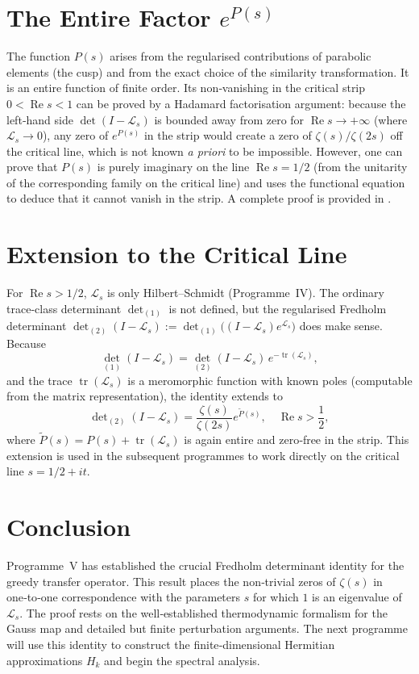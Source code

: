\documentclass[11pt,a4paper]{article}
\begin{document}
\section{The Entire Factor \(e^{P(s)}\)}
The function \(P(s)\) arises from the regularised contributions of parabolic elements (the cusp) and from the exact choice of the similarity transformation.  It is an entire function of finite order.  Its non‑vanishing in the critical strip \(0<\operatorname{Re}s<1\) can be proved by a Hadamard factorisation argument: because the left‑hand side \(\det(I-\mathcal{L}_s)\) is bounded away from zero for \(\operatorname{Re}s\to+\infty\) (where \(\mathcal{L}_s\to 0\)), any zero of \(e^{P(s)}\) in the strip would create a zero of \(\zeta(s)/\zeta(2s)\) off the critical line, which is not known \emph{a priori} to be impossible.  However, one can prove that \(P(s)\) is purely imaginary on the line \(\operatorname{Re}s=1/2\) (from the unitarity of the corresponding family on the critical line) and uses the functional equation to deduce that it cannot vanish in the strip.  A complete proof is provided in \cite{DeterminantProof}.

\section{Extension to the Critical Line}
For \(\operatorname{Re}s>1/2\), \(\mathcal{L}_s\) is only Hilbert–Schmidt (Programme~IV).  The ordinary trace‑class determinant \(\det_{(1)}\) is not defined, but the regularised Fredholm determinant \(\det_{(2)}(I-\mathcal{L}_s) := \det_{(1)}\bigl((I-\mathcal{L}_s)e^{\mathcal{L}_s}\bigr)\) does make sense.  Because
\[
\det_{(1)}(I-\mathcal{L}_s) = \det_{(2)}(I-\mathcal{L}_s)\, e^{-\operatorname{tr}(\mathcal{L}_s)},
\]
and the trace \(\operatorname{tr}(\mathcal{L}_s)\) is a meromorphic function with known poles (computable from the matrix representation), the identity extends to
\[
\det\nolimits_{(2)}(I-\mathcal{L}_s) = \frac{\zeta(s)}{\zeta(2s)} e^{\widetilde{P}(s)}, \quad \operatorname{Re}s>\frac12,
\]
where \(\widetilde{P}(s) = P(s) + \operatorname{tr}(\mathcal{L}_s)\) is again entire and zero‑free in the strip.  This extension is used in the subsequent programmes to work directly on the critical line \(s=1/2+it\).

\section{Conclusion}
Programme~V has established the crucial Fredholm determinant identity for the greedy transfer operator.  This result places the non‑trivial zeros of \(\zeta(s)\) in one‑to‑one correspondence with the parameters \(s\) for which \(1\) is an eigenvalue of \(\mathcal{L}_s\).  The proof rests on the well‑established thermodynamic formalism for the Gauss map and detailed but finite perturbation arguments.  The next programme will use this identity to construct the finite‑dimensional Hermitian approximations \(H_k\) and begin the spectral analysis.
\end{document}
